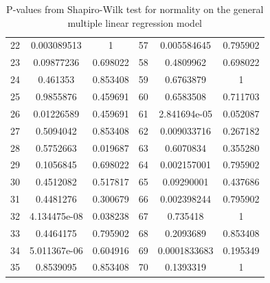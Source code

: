\begin{table}
\begin{tabular}{c:cc|c:cc}
        22 & 0.003089513 & 1 & 57 & 0.005584645 & 0.795902\\ 
        23 & 0.09877236 & 0.698022 & 58 & 0.4809962 & 0.698022\\ 
        24 & 0.461353 & 0.853408 & 59 & 0.6763879 & 1\\ 
        25 & 0.9855876 & 0.459691 & 60 & 0.6583508 & 0.711703\\ 
        26 & 0.01226589 & 0.459691 & 61 & 2.841694e-05 & 0.052087\\
        27 & 0.5094042 & 0.853408 & 62 & 0.009033716 & 0.267182\\ 
        28 & 0.5752663 & 0.019687 & 63 & 0.6070834 & 0.355280\\ 
        29 & 0.1056845 & 0.698022 & 64 & 0.002157001 & 0.795902\\ 
        30 & 0.4512082 & 0.517817 & 65 & 0.09290001 & 0.437686\\ 
        31 & 0.4481276 & 0.300679 & 66 & 0.002398244 & 0.795902\\ 
        32 & 4.134475e-08 & 0.038238 & 67 & 0.735418 & 1\\ 
        33 & 0.4464175 & 0.795902 & 68 & 0.2093689 & 0.853408\\ 
        34 & 5.011367e-06 & 0.604916 & 69 & 0.0001833683 & 0.195349\\
        35 & 0.8539095 & 0.853408 & 70 & 0.1393319 & 1 \\
        \hline
    \end{tabular}
    \caption{P-values from Shapiro-Wilk test for normality on the general multiple linear regression model}
    \label{tab: shapiro_multiple_lm}
\end{table}

